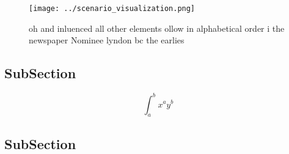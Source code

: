 \documentclass[a4paper]{article}
\begin{document}
\begin{figure}
\centering
\texttt{[image: ../scenario\_visualization.png]}
\caption{oh and inluenced all other elements ollow in alphabetical order i the newspaper Nominee lyndon bc the earlies
}
\end{figure}
 
\subsection{SubSection}

\[ \int_{a}^{b}{x^{a}y^{b}} \]

\subsection{SubSection}
\end{document}
